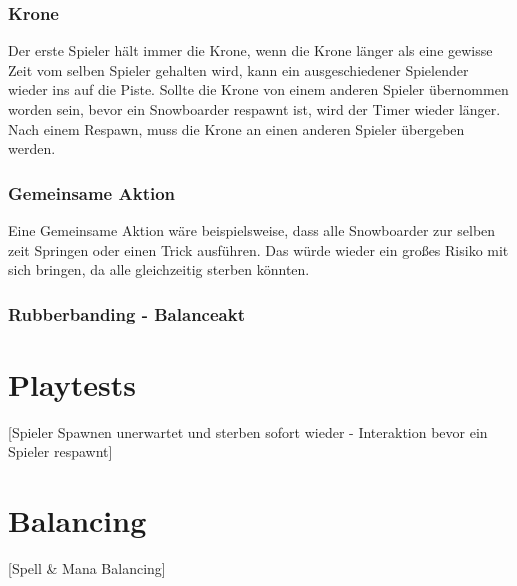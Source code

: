 \subsubsection{Krone}
Der erste Spieler hält immer die Krone, wenn die Krone länger als eine gewisse Zeit vom selben Spieler gehalten wird, kann ein ausgeschiedener Spielender wieder ins auf die Piste. Sollte die Krone von einem anderen Spieler übernommen worden sein, bevor ein Snowboarder respawnt ist, wird der Timer wieder länger. Nach einem Respawn, muss die Krone an einen anderen Spieler übergeben werden.

\subsubsection{Gemeinsame Aktion}
Eine Gemeinsame Aktion wäre beispielsweise, dass alle Snowboarder zur selben zeit Springen oder einen Trick ausführen. Das würde wieder ein großes Risiko mit sich bringen, da alle gleichzeitig sterben könnten.

\subsubsection{Rubberbanding - Balanceakt}

\section{Playtests}

[Spieler Spawnen unerwartet und sterben sofort wieder - Interaktion bevor ein Spieler respawnt]

\section{Balancing}

[Spell \& Mana Balancing]
